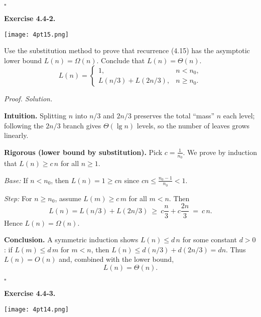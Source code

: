 \documentclass[12pt]{article}
\theoremstyle{definition}
\begin{document}
\hfill$\square$


\newpage

\noindent\textbf{Exercise 4.4-2.}

\dotfill

\begin{center}
    \texttt{[image: 4pt15.png]}
\end{center}

\dotfill

Use the substitution method to prove that recurrence (4.15) has the asymptotic lower bound
$L(n)=\Omega(n)$. Conclude that $L(n)=\Theta(n)$.
\[
\tag{4.15} L(n)=
\begin{cases}
1, & n<n_0,\\[2pt]
L(n/3)+L(2n/3), & n\ge n_0.
\end{cases}
\]

\medskip
\noindent\textit{Proof. Solution.}

\noindent\textbf{Intuition.}
Splitting $n$ into $n/3$ and $2n/3$ preserves the total “mass” $n$ each level; following
the $2n/3$ branch gives $\Theta(\lg n)$ levels, so the number of leaves grows linearly.

\noindent\textbf{Rigorous (lower bound by substitution).}
Pick $c=\frac{1}{n_0}$. We prove by induction that $L(n)\ge c\,n$ for all $n\ge1$.

\emph{Base:} If $n<n_0$, then $L(n)=1\ge c n$ since $c n \le \frac{n_0-1}{n_0}<1$.

\emph{Step:} For $n\ge n_0$, assume $L(m)\ge c\,m$ for all $m<n$. Then
\[
L(n)=L(n/3)+L(2n/3)\ \ge\ c\frac{n}{3}+c\frac{2n}{3}\ =\ c\,n.
\]
Hence $L(n)=\Omega(n)$.

\noindent\textbf{Conclusion.}
A symmetric induction shows $L(n)\le d\,n$ for some constant $d>0$:
if $L(m)\le d\,m$ for $m<n$, then $L(n)\le d(n/3)+d(2n/3)=d n$.
Thus $L(n)=O(n)$ and, combined with the lower bound,
\[
\boxed{L(n)=\Theta(n)}.
\]

\hfill$\square$


\newpage

\noindent\textbf{Exercise 4.4-3.}

\dotfill

\begin{center}
    \texttt{[image: 4pt14.png]}
\end{center}

\dotfill
\end{document}
